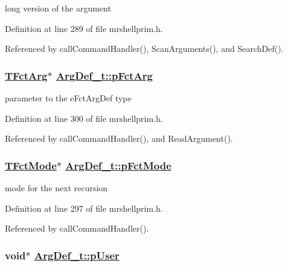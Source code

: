 long version of the argument 



Definition at line 289 of file mrshellprim.h.

Referenced by call\-Command\-Handler(), Scan\-Arguments(), and Search\-Def().\hypertarget{structArgDef__t_0b8bf4785dab58cdbf9124f23cf6346f}{
\subsubsection[pFctArg]{\setlength{\rightskip}{0pt plus 5cm}\hyperlink{structFctArg__t}{TFct\-Arg}$\ast$ \hyperlink{structArgDef__t_0b8bf4785dab58cdbf9124f23cf6346f}{Arg\-Def\_\-t::p\-Fct\-Arg}}}
\label{structArgDef__t_0b8bf4785dab58cdbf9124f23cf6346f}


parameter to the e\-Fct\-Arg\-Def type 



Definition at line 300 of file mrshellprim.h.

Referenced by call\-Command\-Handler(), and Read\-Argument().\hypertarget{structArgDef__t_f0e262a888279888219539148e30391b}{
\subsubsection[pFctMode]{\setlength{\rightskip}{0pt plus 5cm}\hyperlink{structFctMode__t}{TFct\-Mode}$\ast$ \hyperlink{structArgDef__t_f0e262a888279888219539148e30391b}{Arg\-Def\_\-t::p\-Fct\-Mode}}}
\label{structArgDef__t_f0e262a888279888219539148e30391b}


mode for the next recursion 



Definition at line 297 of file mrshellprim.h.

Referenced by call\-Command\-Handler().\hypertarget{structArgDef__t_8705bbfe111541c0184b61a058ddccb1}{
\subsubsection[pUser]{\setlength{\rightskip}{0pt plus 5cm}void$\ast$ \hyperlink{structArgDef__t_8705bbfe111541c0184b61a058ddccb1}{Arg\-Def\_\-t::p\-User}}}
\label{structArgDef__t_8705bbfe111541c0184b61a058ddccb1}


